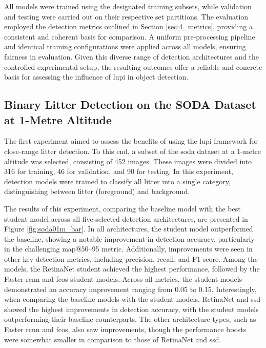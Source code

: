 All models were trained using the designated training subsets, while validation and testing were carried out on their respective set partitions. The evaluation employed the detection metrics outlined in Section \ref{sec:4_metrics}, providing a consistent and coherent basis for comparison. A uniform pre-processing pipeline and identical training configurations were applied across all models, ensuring fairness in evaluation. Given this diverse range of detection architectures and the controlled experimental setup, the resulting outcomes offer a reliable and concrete basis for assessing the influence of \gls{lupi} in object detection.


\subsection{Binary Litter Detection on the SODA Dataset at 1-Metre Altitude}
\label{subsec:5_soda01m_dataset_exp}

The first experiment aimed to assess the benefits of using the \gls{lupi} framework for close-range litter detection. To this end, a subset of the \gls{soda} dataset at a 1-metre altitude was selected, consisting of 452 images. These images were divided into 316 for training, 46 for validation, and 90 for testing. In this experiment, detection models were trained to classify all litter into a single category, distinguishing between litter (foreground) and background.

The results of this experiment, comparing the baseline model with the best student model across all five selected detection architectures, are presented in Figure \ref{fig:soda01m_bar}. In all architectures, the student model outperformed the baseline, showing a notable improvement in detection accuracy, particularly in the challenging \gls{map}@50–95 metric. Additionally, improvements were seen in other key detection metrics, including precision, recall, and F1 score. Among the models, the RetinaNet student achieved the highest performance, followed by the Faster \gls{rcnn} and \gls{fcos} student models. Across all metrics, the student models demonstrated an accuracy improvement ranging from 0.05 to 0.15. Interestingly, when comparing the baseline models with the student models, RetinaNet and \gls{ssd} showed the highest improvements in detection accuracy, with the student models outperforming their baseline counterparts. The other architecture types, such as Faster \gls{rcnn} and \gls{fcos}, also saw improvements, though the performance boosts were somewhat smaller in comparison to those of RetinaNet and \gls{ssd}.


